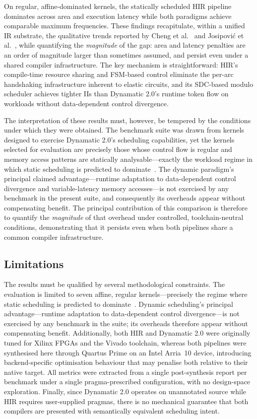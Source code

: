 \documentclass[sigplan,10pt,review,nonacm]{acmart}
\begin{document}
On regular, affine-dominated kernels, the statically scheduled HIR
pipeline dominates across area and execution latency while both
paradigms achieve comparable maximum frequencies. These findings
recapitulate, within a unified IR substrate, the qualitative trends
reported by Cheng et al.~\cite{9378784} and Josipović et
al.~\cite{10.1145/3373087.3375391}, while quantifying the
\emph{magnitude} of the gap: area and latency penalties are an order
of magnitude larger than sometimes assumed, and persist even under a
shared compiler infrastructure. The key mechanism is straightforward:
HIR's compile-time resource sharing and FSM-based control eliminate the
per-arc handshaking infrastructure inherent to elastic circuits, and its
SDC-based modulo scheduler achieves tighter IIs than Dynamatic 2.0's runtime
token flow on workloads without data-dependent control divergence.

The interpretation of these results must, however, be tempered by the
conditions under which they were obtained. The benchmark suite was drawn
from kernels designed to exercise Dynamatic 2.0's scheduling capabilities,
yet the kernels selected for evaluation are precisely those whose control
flow is regular and memory access patterns are statically
analysable---exactly the workload regime in which static scheduling is
predicted to dominate~\cite{9378784}. The dynamic paradigm's principal
claimed advantage---runtime adaptation to data-dependent control
divergence and variable-latency memory accesses---is not exercised by
any benchmark in the present suite, and consequently its overheads
appear without compensating benefit. The principal contribution of this
comparison is therefore to quantify the \emph{magnitude} of that
overhead under controlled, toolchain-neutral conditions, demonstrating
that it persists even when both pipelines share a common compiler
infrastructure.

\subsection{Limitations}
\label{sec:limitations}

The results must be qualified by several methodological constraints.
The evaluation is limited to seven affine, regular kernels---precisely
the regime where static scheduling is predicted to dominate~\cite{9378784}.
Dynamic scheduling's principal advantage---runtime adaptation to
data-dependent control divergence---is not exercised by any benchmark
in the suite; its overheads therefore appear without compensating
benefit. Additionally, both HIR and Dynamatic 2.0 were originally tuned for
Xilinx FPGAs and the Vivado toolchain, whereas both pipelines were
synthesised here through Quartus Prime on an Intel Arria~10 device,
introducing backend-specific optimisation behaviour that may penalise both
relative to their native target. All metrics were extracted
from a single post-synthesis report per benchmark under a single
pragma-prescribed configuration, with no design-space exploration. Finally, since
Dynamatic 2.0 operates on unannotated source while HIR requires
user-supplied pragmas, there is no mechanical guarantee that both
compilers are presented with semantically equivalent scheduling intent.
\end{document}
